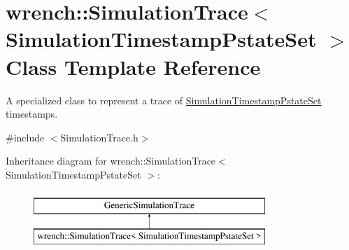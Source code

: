 \hypertarget{classwrench_1_1_simulation_trace_3_01_simulation_timestamp_pstate_set_01_4}{}\section{wrench\+:\+:Simulation\+Trace$<$ Simulation\+Timestamp\+Pstate\+Set $>$ Class Template Reference}
\label{classwrench_1_1_simulation_trace_3_01_simulation_timestamp_pstate_set_01_4}


A specialized class to represent a trace of \hyperlink{classwrench_1_1_simulation_timestamp_pstate_set}{Simulation\+Timestamp\+Pstate\+Set} timestamps.  




{\ttfamily \#include $<$Simulation\+Trace.\+h$>$}

Inheritance diagram for wrench\+:\+:Simulation\+Trace$<$ Simulation\+Timestamp\+Pstate\+Set $>$\+:\begin{figure}[H]
\begin{center}
\leavevmode
\includegraphics[height=2.000000cm]{classwrench_1_1_simulation_trace_3_01_simulation_timestamp_pstate_set_01_4}
\end{center}
\end{figure}
